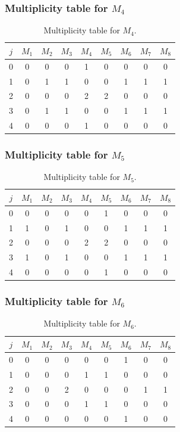 \subsubsection{Multiplicity table for $M_{4}$}

\begin{table}[ht]
\centering
\begin{tabular}{c|cccccccc}
\hline
$j$ & $M_{1}$ & $M_{2}$ & $M_{3}$ & $M_{4}$ & $M_{5}$ & $M_{6}$ & $M_{7}$ & $M_{8}$ \\
\hline
0 & 0 & 0 & 0 & 1 & 0 & 0 & 0 & 0 \\
1 & 0 & 1 & 1 & 0 & 0 & 1 & 1 & 1 \\
2 & 0 & 0 & 0 & 2 & 2 & 0 & 0 & 0 \\
3 & 0 & 1 & 1 & 0 & 0 & 1 & 1 & 1 \\
4 & 0 & 0 & 0 & 1 & 0 & 0 & 0 & 0 \\
\hline
\end{tabular}
\caption{Multiplicity table for $M_{4}$.}
\end{table}

\subsubsection{Multiplicity table for $M_{5}$}

\begin{table}[ht]
\centering
\begin{tabular}{c|cccccccc}
\hline
$j$ & $M_{1}$ & $M_{2}$ & $M_{3}$ & $M_{4}$ & $M_{5}$ & $M_{6}$ & $M_{7}$ & $M_{8}$ \\
\hline
0 & 0 & 0 & 0 & 0 & 1 & 0 & 0 & 0 \\
1 & 1 & 0 & 1 & 0 & 0 & 1 & 1 & 1 \\
2 & 0 & 0 & 0 & 2 & 2 & 0 & 0 & 0 \\
3 & 1 & 0 & 1 & 0 & 0 & 1 & 1 & 1 \\
4 & 0 & 0 & 0 & 0 & 1 & 0 & 0 & 0 \\
\hline
\end{tabular}
\caption{Multiplicity table for $M_{5}$.}
\end{table}

\subsubsection{Multiplicity table for $M_{6}$}

\begin{table}[ht]
\centering
\begin{tabular}{c|cccccccc}
\hline
$j$ & $M_{1}$ & $M_{2}$ & $M_{3}$ & $M_{4}$ & $M_{5}$ & $M_{6}$ & $M_{7}$ & $M_{8}$ \\
\hline
0 & 0 & 0 & 0 & 0 & 0 & 1 & 0 & 0 \\
1 & 0 & 0 & 0 & 1 & 1 & 0 & 0 & 0 \\
2 & 0 & 0 & 2 & 0 & 0 & 0 & 1 & 1 \\
3 & 0 & 0 & 0 & 1 & 1 & 0 & 0 & 0 \\
4 & 0 & 0 & 0 & 0 & 0 & 1 & 0 & 0 \\
\hline
\end{tabular}
\caption{Multiplicity table for $M_{6}$.}
\end{table}

